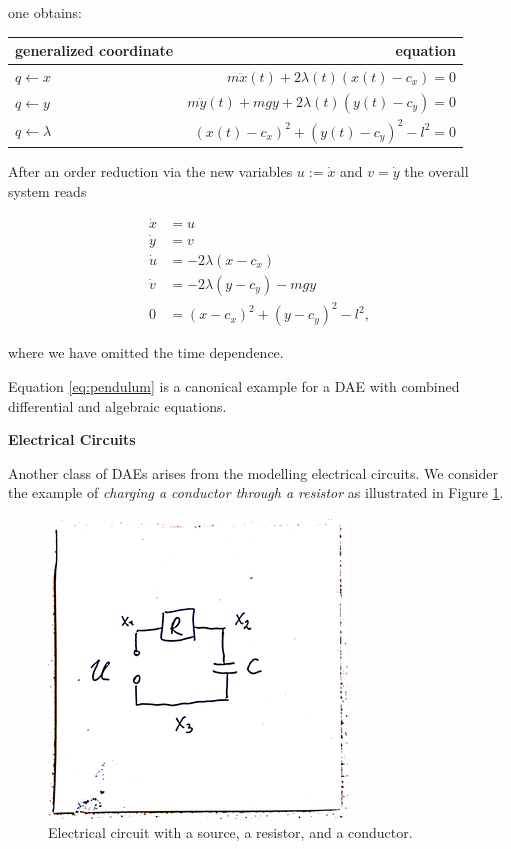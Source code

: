 \documentclass[]{book}
\theoremstyle{definition}
\theoremstyle{definition}
\theoremstyle{definition}
\theoremstyle{remark}
\let\BeginKnitrBlock\begin \let\EndKnitrBlock\end
\begin{document}
one obtains:

\begin{longtable}[]{@{}lr@{}}
\toprule
generalized coordinate & equation\tabularnewline
\midrule
\endhead
\(q \leftarrow x\) &
\(m\ddot x(t) + 2 \lambda(t) (x(t) - c_x) = 0\)\tabularnewline
\(q \leftarrow y\) &
\(m\ddot y(t) + mgy + 2 \lambda(t) (y(t) - c_y) = 0\)\tabularnewline
\(q \leftarrow \lambda\) &
\((x(t) - c_x)^2 + (y(t) - c_y)^2 - l^2 =0\)\tabularnewline
\bottomrule
\end{longtable}

\BeginKnitrBlock{example}[The Pendulum]
\protect\hypertarget{exm:the-pendulum}{}{\label{exm:the-pendulum}
{} } After an order reduction via the new
variables \(u:=\dot x\) and \(v=\dot y\) the overall system reads

\begin{equation}
\begin{split}
\dot x &= u \\
\dot y &= v \\
\dot u &= - 2 \lambda (x - c_x) \\ 
\dot v &= - 2 \lambda (y - c_y) - mgy \\
0&=(x - c_x)^2 + (y - c_y)^2 - l^2, 
\end{split}
\label{eq:pendulum}
\end{equation}

where we have omitted the time dependence.
\EndKnitrBlock{example}

Equation \eqref{eq:pendulum} is a canonical example for a DAE with
combined differential and algebraic equations.

\textbf{Electrical Circuits}

Another class of DAEs arises from the modelling electrical circuits. We
consider the example of \emph{charging a conductor through a resistor}
as illustrated in Figure \ref{fig:circuit}.

\begin{figure}

{\centering \includegraphics[width=0.4\linewidth]{pics/circuit} 

}

\caption{Electrical circuit with a source, a resistor, and a conductor.}\label{fig:circuit}
\end{figure}
\end{document}
